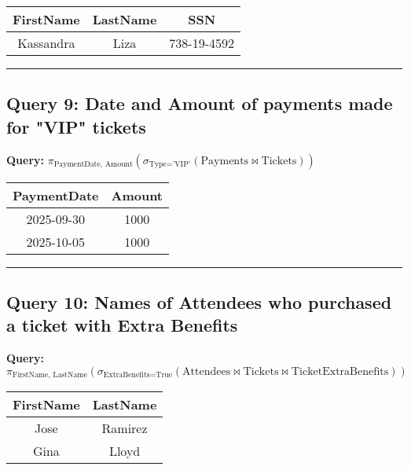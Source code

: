 \documentclass{article}
\begin{document}
\begin{center}
\begin{tabular}{ccc}
\toprule
\textbf{FirstName} & \textbf{LastName} & \textbf{SSN} \\
\midrule
Kassandra & Liza & 738-19-4592 \\
\bottomrule
\end{tabular}
\end{center}

\hrule

\subsection*{Query 9: Date and Amount of payments made for "VIP" tickets}

\noindent \textbf{Query:} $\pi_{\text{PaymentDate, Amount}} \left( \sigma_{\text{Type='VIP'}} \left( \text{Payments} \bowtie \text{Tickets} \right) \right)$

\begin{center}
\begin{tabular}{cc}
\toprule
\textbf{PaymentDate} & \textbf{Amount} \\
\midrule
2025-09-30 & 1000 \\
2025-10-05 & 1000 \\
\bottomrule
\end{tabular}
\end{center}

\hrule

\subsection*{Query 10: Names of Attendees who purchased a ticket with Extra Benefits}

\noindent \textbf{Query:} $\pi_{\text{FirstName, LastName}} \left( \sigma_{\text{ExtraBenefits=True}} \left( \text{Attendees} \bowtie \text{Tickets} \bowtie \text{TicketExtraBenefits} \right) \right)$

\begin{center}
\begin{tabular}{cc}
\toprule
\textbf{FirstName} & \textbf{LastName} \\
\midrule
Jose & Ramirez \\
Gina & Lloyd \\
\bottomrule
\end{tabular}
\end{center}
\end{document}
